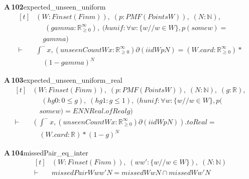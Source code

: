 \documentclass[conference]{IEEEtran}
\theoremstyle{definition}
\newcommand{\lean}[1]{\textsf{\footnotesize #1}}
\begin{document}
\noindent\textbf{A\,102}\quad\lean{expected\_unseen\_uniform}
{\footnotesize\[ \begin{aligned}[t]
&(\mathit{W} : \mathit{Finset} (\mathit{Fin} \mathit{m})),\; (\mathit{p} : \mathit{PMF} (\mathit{Points} \mathit{W})),\; (\mathit{N} : \mathbb{N} ),\\
&\quad \; (\mathit{gamma} : \mathbb{R}_{\geq0}^{\infty} ),\; (\mathit{hunif} : \forall \mathit{w} : \{ \mathit{w} // \mathit{w} \in \mathit{W}\} , \mathit{p} (\mathit{some} \mathit{w}) =\\
&\quad \mathit{gamma})\\
\vdash\;&\int^{-} \mathit{x}, (\mathit{unseenCount} \mathit{W} \mathit{x} : \mathbb{R}_{\geq0}^{\infty} ) ∂(\mathit{iid} \mathit{W} \mathit{p} \mathit{N}) = (\mathit{W}.\mathit{card} : \mathbb{R}_{\geq0}^{\infty} ) *\\
&\quad (1 - \mathit{gamma})^{\mathit{N}}
\end{aligned} \]}

\noindent\textbf{A\,103}\quad\lean{expected\_unseen\_uniform\_real}
{\footnotesize\[ \begin{aligned}[t]
&(\mathit{W} : \mathit{Finset} (\mathit{Fin} \mathit{m})),\; (\mathit{p} : \mathit{PMF} (\mathit{Points} \mathit{W})),\; (\mathit{N} : \mathbb{N} ),\; (\mathit{g} : \mathbb{R} ),\\
&\quad \; (\mathit{hg0} : 0 \leq \mathit{g}),\; (\mathit{hg1} : \mathit{g} \leq 1),\; (\mathit{hunif} : \forall \mathit{w} : \{ \mathit{w} // \mathit{w} \in \mathit{W}\} , \mathit{p} (\\
&\quad \mathit{some} \mathit{w}) = \mathit{ENNReal}.\mathit{ofReal} \mathit{g})\\
\vdash\;&(\int^{-} \mathit{x}, (\mathit{unseenCount} \mathit{W} \mathit{x} : \mathbb{R}_{\geq0}^{\infty} ) ∂(\mathit{iid} \mathit{W} \mathit{p} \mathit{N})).\mathit{toReal} =\\
&\quad (\mathit{W}.\mathit{card} : \mathbb{R} ) * (1 - \mathit{g})^{\mathit{N}}
\end{aligned} \]}

\noindent\textbf{A\,104}\quad\lean{missedPair\_eq\_inter}
{\footnotesize\[ \begin{aligned}[t]
&(\mathit{W} : \mathit{Finset} (\mathit{Fin} \mathit{m})),\; (\mathit{w} \mathit{w'} : \{ \mathit{w} // \mathit{w} \in \mathit{W}\} ),\; (\mathit{N} : \mathbb{N} )\\
\vdash\;&\mathit{missedPair} \mathit{W} \mathit{w} \mathit{w'} \mathit{N} = \mathit{missed} \mathit{W} \mathit{w} \mathit{N} \cap \mathit{missed} \mathit{W} \mathit{w'} \mathit{N}
\end{aligned} \]}
\end{document}
